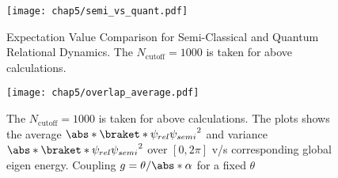 \begin{figure}[!h]
        \centering
        \texttt{[image: chap5/semi\_vs\_quant.pdf]}
        \caption[Expectation Value Comparison for Semi-Classical and
         Quantum Relational Dynamics]{Expectation Value Comparison 
         for Semi-Classical and Quantum Relational Dynamics. The $N_{\mathrm{cutoff}}=1000$ is taken for above calculations.}
        \label{fig:chap5_JCM_schematic}
\end{figure}
\begin{figure}[!h]
        \centering
        \texttt{[image: chap5/overlap\_average.pdf]}
        \caption[Average $\abs*{\braket*{\psi_{rel}}{\psi_{semi}}}^2$ 
        (\& variance $\abs*{\braket*{\psi_{rel}}{\psi_{semi}}}^2$)
         v/s Global Eigen Energy]{The $N_{\mathrm{cutoff}}=1000$ is taken for above calculations.
         The plots shows the average $\abs*{\braket*{\psi_{rel}}{\psi_{semi}}}^2$ and 
         variance $\abs*{\braket*{\psi_{rel}}{\psi_{semi}}}^2$ over \([0, 2\pi]\) v/s corresponding global eigen energy.
         Coupling \(g = \theta / \abs*{\alpha}\) for a fixed \(\theta\)}
        \label{fig:chap5_JCM_schematic_2}
\end{figure}